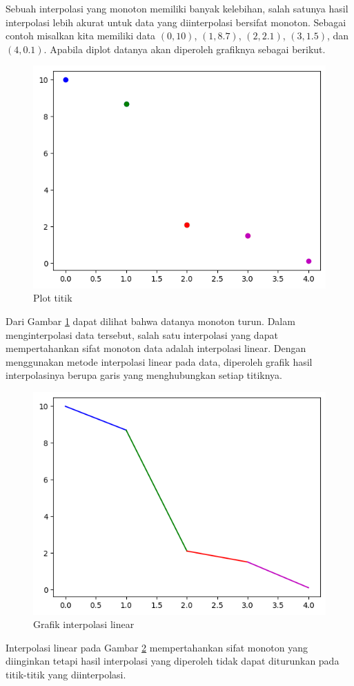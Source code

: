 Sebuah interpolasi yang monoton memiliki banyak kelebihan, salah satunya hasil interpolasi lebih akurat untuk data yang diinterpolasi bersifat monoton. Sebagai contoh misalkan kita memiliki data $(0,10)$, $(1,8.7)$, $(2,2.1)$, $(3,1.5)$, dan $(4,0.1)$. Apabila diplot datanya akan diperoleh grafiknya sebagai berikut.
\begin{figure}[H]
    \centering
    \includegraphics{Images/plotSplineKubik.png}
    \caption{Plot titik}
    \label{titik}
\end{figure}
Dari Gambar \ref{titik} dapat dilihat bahwa datanya monoton turun. Dalam menginterpolasi data tersebut, salah satu interpolasi yang dapat mempertahankan sifat monoton data adalah interpolasi linear. Dengan menggunakan metode interpolasi linear pada data, diperoleh grafik hasil interpolasinya berupa garis yang menghubungkan setiap titiknya.
\begin{figure}[H]
    \centering
    \includegraphics{Images/linear.png}
    \caption{Grafik interpolasi linear}
    \label{linear}
\end{figure}
Interpolasi linear pada Gambar \ref{linear} mempertahankan sifat monoton yang diinginkan tetapi hasil interpolasi yang diperoleh tidak dapat diturunkan pada titik-titik yang diinterpolasi.

